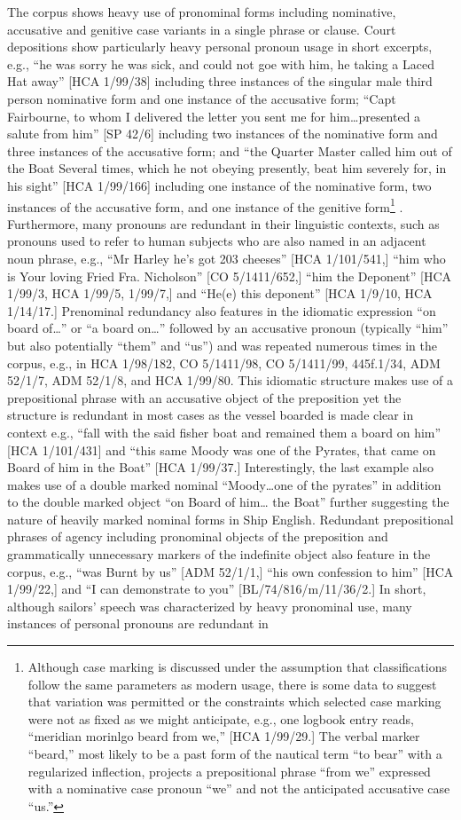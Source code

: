 The corpus shows heavy use of pronominal forms including nominative, accusative and genitive case variants in a single phrase or clause. Court depositions show particularly heavy personal pronoun usage in short excerpts, e.g., “he was sorry he was sick, and could not goe with him, he taking a Laced Hat away” [HCA 1/99/38] including three instances of the singular male third person nominative form and one instance of the accusative form; “Capt Fairbourne, to whom I delivered the letter you sent me for him…presented a salute from him” [SP 42/6] including two instances of the nominative form and three instances of the accusative form; and “the Quarter Master called him out of the Boat Several times, which he not obeying presently, beat him severely for, in his sight” [HCA 1/99/166] including one instance of the nominative form, two instances of the accusative form, and one instance of the genitive form\footnote{Although case marking is discussed under the assumption that classifications follow the same parameters as modern usage, there is some data to suggest that variation was permitted or the constraints which selected case marking were not as fixed as we might anticipate, e.g., one logbook entry reads, “meridian morinlgo beard from we,” [HCA 1/99/29.] The verbal marker “beard,” most likely to be a past form of the nautical term “to bear” with a regularized inflection, projects a prepositional phrase “from we” expressed with a nominative case pronoun “we” and not the anticipated accusative case “us.”} . Furthermore, many pronouns are redundant in their linguistic contexts, such as pronouns used to refer to human subjects who are also named in an adjacent noun phrase, e.g., “Mr Harley he’s got 203 cheeses” [HCA 1/101/541,] “him who is Your loving Fried Fra. Nicholson” [CO 5/1411/652,] “him the Deponent” [HCA 1/99/3, HCA 1/99/5, 1/99/7,] and “He(e) this deponent” [HCA 1/9/10, HCA 1/14/17.] Prenominal redundancy also features in the idiomatic expression “on board of…” or “a board on…” followed by an accusative pronoun (typically “him” but also potentially “them” and “us”) and was repeated numerous times in the corpus, e.g., in HCA 1/98/182, CO 5/1411/98, CO 5/1411/99, 445f.1/34, ADM 52/1/7, ADM 52/1/8, and HCA 1/99/80. This idiomatic structure makes use of a prepositional phrase with an accusative object of the preposition yet the structure is redundant in most cases as the vessel boarded is made clear in context e.g., “fall with the said fisher boat and remained them a board on him” [HCA 1/101/431] and “this same Moody was one of the Pyrates, that came on Board of him in the Boat” [HCA 1/99/37.] Interestingly, the last example also makes use of a double marked nominal “Moody…one of the pyrates” in addition to the double marked object “on Board of him… the Boat” further suggesting the nature of heavily marked nominal forms in Ship English. Redundant prepositional phrases of agency including pronominal objects of the preposition and grammatically unnecessary markers of the indefinite object also feature in the corpus, e.g., “was Burnt by us” [ADM 52/1/1,] “his own confession to him” [HCA 1/99/22,] and “I can demonstrate to you” [BL/74/816/m/11/36/2.] In short, although sailors’ speech was characterized by heavy pronominal use, many instances of personal pronouns are redundant in 